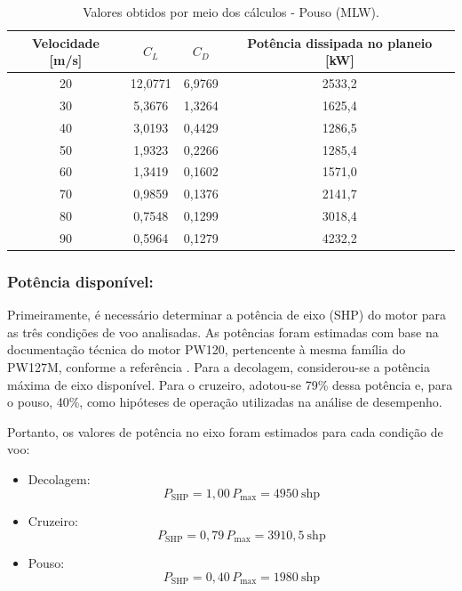 \begin{table}[H]
    \centering
    \caption{Valores obtidos por meio dos cálculos - Pouso (MLW).}
    \label{tab:pouso_p_req}
    \begin{tabular}{c c c c}
    \hline
        Velocidade [m/s] & $C_L$ & $C_D$ & Potência dissipada no planeio [kW] \\
    \hline
        20 & 12{,}0771 & 6{,}9769 & 2533{,}2 \\
        30 & 5{,}3676 & 1{,}3264 & 1625{,}4 \\
        40 & 3{,}0193 & 0{,}4429 & 1286{,}5 \\
        50 & 1{,}9323 & 0{,}2266 & 1285{,}4 \\
        60 & 1{,}3419 & 0{,}1602 & 1571{,}0 \\
        70 & 0{,}9859 & 0{,}1376 & 2141{,}7 \\
        80 & 0{,}7548 & 0{,}1299 & 3018{,}4 \\
        90 & 0{,}5964 & 0{,}1279 & 4232{,}2 \\
    \hline
    \end{tabular}
\end{table}

\subsubsection{Potência disponível:}

Primeiramente, é necessário determinar a potência de eixo (SHP) do motor para as três condições de voo analisadas. As potências foram estimadas com base na documentação técnica do motor PW120, pertencente à mesma família do PW127M, conforme a referência \cite{manual_pw120}. Para a decolagem, considerou-se a potência máxima de eixo disponível. Para o cruzeiro, adotou-se 79\% dessa potência e, para o pouso, 40\%, como hipóteses de operação utilizadas na análise de desempenho.


Portanto, os valores de potência no eixo foram estimados para cada condição de voo:

\begin{itemize}
    \item Decolagem:
    \[
        P_{\mathrm{SHP}} = 1{,}00\,P_{\max} = 4950~\mathrm{shp}
    \]

    \item Cruzeiro:
    \[
        P_{\mathrm{SHP}} = 0{,}79\,P_{\max} = 3910{,}5~\mathrm{shp}
    \]

    \item Pouso:
    \[
        P_{\mathrm{SHP}} = 0{,}40\,P_{\max} = 1980~\mathrm{shp}
    \]
\end{itemize}


